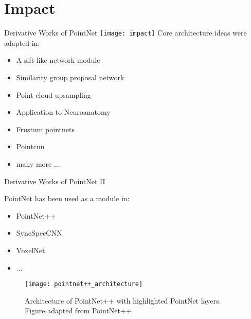 \section{Impact}
\begin{frame}[c]{Derivative Works of PointNet}
    \texttt{[image: impact]}
    \large
    \pause
    Core architecture ideas were adapted in:
    \begin{multicols}{2}
        \begin{itemize}
            \item A sift-like network module \cite{jiang2018sift}
            \item Similarity group proposal network \cite{wang2018sgpn}
            \item Point cloud upsampling \cite{yu2018pu}
            \item Application to Neuroanatomy \cite{gutierrez2018deep}
            \item Frustum pointnets \cite{qi2018frustum}
            \item Pointcnn \cite{li2018pointcnn}
            \item many more ...
        \end{itemize}
    \end{multicols}
\end{frame}

\begin{frame}[c]{Derivative Works of PointNet II}
    \large
    \begin{multicols}{2}
        PointNet has been used as a module in:
        \begin{itemize}
            \item PointNet++~\cite{qi2017pointnet++}
            \item SyncSpecCNN~\cite{yi2017syncspeccnn}
            \item VoxelNet~\cite{zhou2018voxelnet}
            \item ...
        \end{itemize}
        \begin{figure}
            \texttt{[image: pointnet++\_architecture]}
            \caption{Architecture of PointNet++ with highlighted PointNet layers. Figure adapted from PointNet++~\cite{qi2017pointnet++}}
        \end{figure}
    \end{multicols}
\end{frame}

